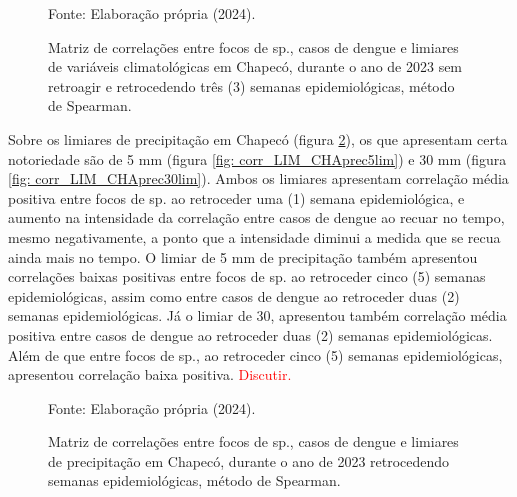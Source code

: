 \documentclass[
	12pt,				%
	openright,			%
	oneside,			%
	a4paper,			%
	english,			%
	french,				%
	spanish,			%
	brazil				%
	dvipsnames, table]{abntex2}
\begin{document}
\begin{figure}[htbp]
    \begin{center}
    \caption{Matriz de correlações entre focos de  sp., casos de dengue e limiares de variáveis climatológicas em Chapecó, durante o ano de 2023 sem retroagir e retrocedendo três (3) semanas epidemiológicas, método de Spearman.}
    \label{fig: matriz_corr_LIM_CHAretro}
        \hfill
    \end{center}
    \small{Fonte: Elaboração própria (2024).}
\end{figure}

\indent Sobre os limiares de precipitação em Chapecó (figura \ref{fig: matriz_corr_LIM_CHAprec}), os que apresentam certa notoriedade são de 5 mm (figura \ref{fig: corr_LIM_CHAprec5lim}) e 30 mm (figura \ref{fig: corr_LIM_CHAprec30lim}). Ambos os limiares apresentam correlação média positiva entre focos de  sp. ao retroceder uma (1) semana epidemiológica, e aumento na intensidade da correlação entre casos de dengue ao recuar no tempo, mesmo negativamente, a ponto que a intensidade diminui a medida que se recua ainda mais no tempo. O limiar de 5 mm de precipitação também apresentou correlações baixas positivas entre focos de  sp. ao retroceder cinco (5) semanas epidemiológicas, assim como entre casos de dengue ao retroceder duas (2) semanas epidemiológicas. Já o limiar de 30, apresentou também correlação média positiva entre casos de dengue ao retroceder duas (2) semanas epidemiológicas. Além de que entre focos de  sp., ao retroceder cinco (5) semanas epidemiológicas, apresentou correlação baixa positiva. \textcolor{red}{Discutir.}

\begin{figure}[htbp]
    \begin{center}
    \caption{Matriz de correlações entre focos de  sp., casos de dengue e limiares de precipitação em Chapecó, durante o ano de 2023 retrocedendo semanas epidemiológicas, método de Spearman.}
    \label{fig: matriz_corr_LIM_CHAprec}
        \hfill
    \end{center}
    \small{Fonte: Elaboração própria (2024).}
\end{figure}
\end{document}
